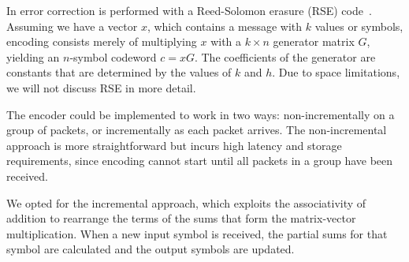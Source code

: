 
In \OurSys error correction is performed with a Reed-Solomon erasure (RSE) code~. %
Assuming we have a vector $x$,
which contains a message with $k$ values or symbols, encoding consists merely
of multiplying $x$ with a $k \times n$ generator matrix $G$, yielding an $n$-symbol
codeword $c = xG$.  The coefficients of the
generator are constants that are determined by the values of $k$ and
$h$.
Due to space limitations, we will not discuss RSE in more detail.

The encoder could be implemented to work in two ways:
non-incrementally on a group of packets, or incrementally as each
packet arrives. The non-incremental approach is more straightforward
but incurs high latency and storage requirements, since  encoding
cannot start until all packets in a group have been received.

We opted for the incremental approach, which exploits the associativity of addition to
rearrange the terms of the sums that form the matrix-vector multiplication.
When a new input symbol is received, the partial sums for that symbol are
calculated and the output symbols are updated.

